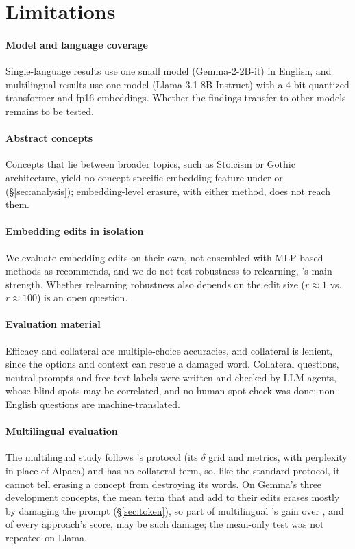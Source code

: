 \section*{Limitations}

\paragraph{Model and language coverage}
Single-language results use one small model (Gemma-2-2B-it) in English, and multilingual results use one model (Llama-3.1-8B-Instruct) with a 4-bit quantized transformer and fp16 embeddings.
Whether the findings transfer to other models remains to be tested.

\paragraph{Abstract concepts}
Concepts that lie between broader topics, such as Stoicism or Gothic architecture, yield no concept-specific embedding feature under \ember{} or \cinder{} (\S\ref{sec:analysis}); embedding-level erasure, with either method, does not reach them.

\paragraph{Embedding edits in isolation}
We evaluate embedding edits on their own, not ensembled with MLP-based methods as \ember{} recommends, and we do not test robustness to relearning, \ember{}'s main strength.
Whether relearning robustness also depends on the edit size ($r \approx 1$ vs.\ $r \approx 100$) is an open question.

\paragraph{Evaluation material}
Efficacy and collateral are multiple-choice accuracies, and collateral is lenient, since the options and context can rescue a damaged word.
Collateral questions, neutral prompts and free-text labels were written and checked by LLM agents, whose blind spots may be correlated, and no human spot check was done; non-English questions are machine-translated.

\paragraph{Multilingual evaluation}
The multilingual study follows \ember{}'s protocol (its $\delta$ grid and metrics, with perplexity in place of Alpaca) and has no collateral term, so, like the standard protocol, it cannot tell erasing a concept from destroying its words.
On Gemma's three development concepts, the mean term that \cinderz{} and \ember{} add to their edits erases mostly by damaging the prompt (\S\ref{sec:token}), so part of multilingual \cinderz{}'s gain over \cinder{}, and of every approach's score, may be such damage; the mean-only test was not repeated on Llama.

